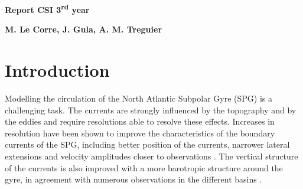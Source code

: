 \documentclass[11pt,a4paper]{article}
\begin{document}
\begin{center}
\begin{spacing}{2.05}
{\fontsize{20}{20}
\bf
Report CSI 3\textsuperscript{rd} year\\ 
}
\end{spacing}
\end{center}
\vspace{-1.25cm}
\begin{center}
{\fontsize{14}{20}
\bf
M. Le Corre, J. Gula, A. M. Treguier \\
\bigskip
}
\end{center}



\section{Introduction}


Modelling the circulation of the North Atlantic Subpolar Gyre (SPG) is a challenging task. The currents are strongly influenced by the topography and by the eddies and require resolutions able to resolve these effects. Increases in resolution have been shown to improve the characteristics of the boundary currents of the SPG, including better position of the currents, narrower lateral extensions and velocity amplitudes closer to observations \citep{treguier2005,marzocchi2015,danek2019}.  The vertical structure of the currents is also improved with a more barotropic structure around the gyre, in agreement with numerous observations in the different basins \citep{vanaken1995,daniault2011,fischer2004}. 
\end{document}
